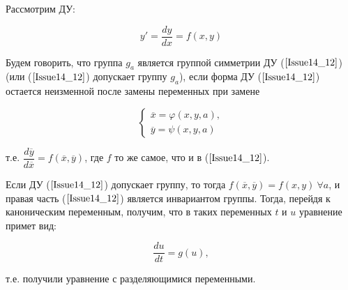Рассмотрим ДУ: 

\begin{equation}
	y' = \dfrac{dy}{dx} = f(x,y)
	\label{Issue14_12}
\end{equation}

Будем говорить, что группа $g_a$ является $\textbf{группой симметрии}$ ДУ ($\ref{Issue14_12}$) (или ($\ref{Issue14_12}$) допускает группу $g_a$), если форма ДУ ($\ref{Issue14_12}$) остается неизменной после замены переменных при замене 

\begin{equation}
	\begin{cases}
		\overline{x} = \varphi(x,y,a), \\
		\overline{y} = \psi(x,y,a)
	\end{cases}
\end{equation}

т.е. $\dfrac{d\overline{y}}{d\overline{x}} = f(\overline{x}, \overline{y})$, где $f$ то же самое, что и в ($\ref{Issue14_12}$).

Если ДУ ($\ref{Issue14_12}$) допускает группу, то тогда $f(\overline{x}, \overline{y}) = f(x,y)\ \forall a$, и правая часть ($\ref{Issue14_12}$) является инвариантом группы. Тогда, перейдя к каноническим переменным, получим, что в таких переменных $t$ и $u$ уравнение примет вид:

\begin{equation}
	\dfrac{du}{dt} = g(u),
	\label{Issue14_13}
\end{equation}

т.е. получили уравнение с разделяющимися переменными.





